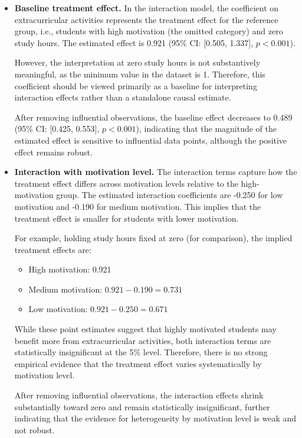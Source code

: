 \documentclass[10pt,letterpaper]{article}
\begin{document}
\begin{itemize}

\item \textbf{Baseline treatment effect.} 
In the interaction model, the coefficient on extracurricular activities represents the treatment effect for the reference group, i.e., students with high motivation (the omitted category) and zero study hours. The estimated effect is 0.921 (95\% CI: [0.505, 1.337], $p < 0.001$). 

However, the interpretation at zero study hours is not substantively meaningful, as the minimum value in the dataset is 1. Therefore, this coefficient should be viewed primarily as a baseline for interpreting interaction effects rather than a standalone causal estimate.

After removing influential observations, the baseline effect decreases to 0.489 (95\% CI: [0.425, 0.553], $p < 0.001$), indicating that the magnitude of the estimated effect is sensitive to influential data points, although the positive effect remains robust.

\item \textbf{Interaction with motivation level.} 
The interaction terms capture how the treatment effect differs across motivation levels relative to the high-motivation group. The estimated interaction coefficients are -0.250 for low motivation and -0.190 for medium motivation. This implies that the treatment effect is smaller for students with lower motivation.

For example, holding study hours fixed at zero (for comparison), the implied treatment effects are:
\begin{itemize}
    \item High motivation: 0.921
    \item Medium motivation: $0.921 - 0.190 = 0.731$
    \item Low motivation: $0.921 - 0.250 = 0.671$
\end{itemize}

While these point estimates suggest that highly motivated students may benefit more from extracurricular activities, both interaction terms are statistically insignificant at the 5\% level. Therefore, there is no strong empirical evidence that the treatment effect varies systematically by motivation level.

After removing influential observations, the interaction effects shrink substantially toward zero and remain statistically insignificant, further indicating that the evidence for heterogeneity by motivation level is weak and not robust.


\end{itemize}
\end{document}
